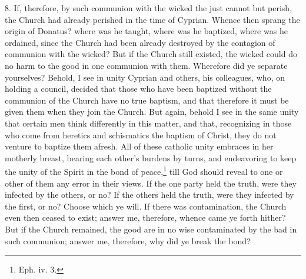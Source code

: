 8. If, therefore, by such communion with the wicked the just cannot but perish, the Church had already perished in the time of Cyprian. Whence then sprang the origin of Donatus? where was he taught, where was he baptized, where was he ordained, since the Church had been already destroyed by the contagion of communion with the wicked? But if the Church still existed, the wicked could do no harm to the good in one communion with them. Wherefore did ye separate yourselves? Behold, I see in unity Cyprian and others, his colleagues, who, on holding a council, decided that those who have been baptized without the communion of the Church have no true baptism, and that therefore it must be given them when they join the Church. But again, behold I see in the same unity that certain men think differently in this matter, and that, recognizing in those who come from heretics and schismatics the baptism of Christ, they do not venture to baptize them afresh. All of these catholic unity embraces in her motherly breast, bearing each other’s burdens by turns, and endeavoring to keep the unity of the Spirit in the bond of peace,\footnote{\par  Eph. iv. 3.} till God should reveal to one or other of them any error in their views. If the one party held the truth, were they infected by the others, or no? If the others held the truth, were they infected by the first, or no? Choose which ye will. If there was contamination, the Church even then ceased to exist; answer me, therefore, whence came ye forth hither? But if the Church remained, the good are in no wise contaminated by the bad in such communion; answer me, therefore, why did ye break the bond?

